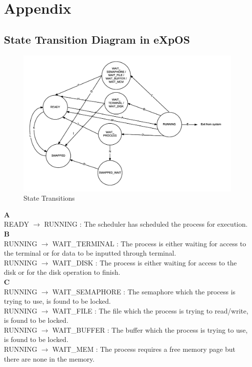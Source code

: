 \chapter{Appendix}
\label{app2}

\section{State Transition Diagram in eXpOS}

\begin{figure}[ht]
\centering
\includegraphics[scale=0.70]{figures/state.png}
\caption{\footnotesize State Transitions}
\label{fig_1}
\end{figure}

\textbf{A}\\
READY $\rightarrow$ RUNNING : The scheduler has scheduled the process for execution.\\

\textbf{B}\\
RUNNING  $\rightarrow$ WAIT\_TERMINAL : The process is either waiting for access to the terminal or for data to be inputted through terminal.\\
RUNNING  $\rightarrow$ WAIT\_DISK :  The process is either waiting for access to the disk or for the disk operation to finish.\\

\textbf{C}\\
RUNNING $\rightarrow$ WAIT\_SEMAPHORE : The semaphore which the process is trying to use, is found to be locked.\\
RUNNING $\rightarrow$ WAIT\_FILE : The file which the process is trying to read/write, is found to be locked.\\
RUNNING $\rightarrow$ WAIT\_BUFFER : The buffer which the process is trying to use, is found to be locked.\\
RUNNING $\rightarrow$ WAIT\_MEM : The process requires a free memory page but there are none in the memory.\\

